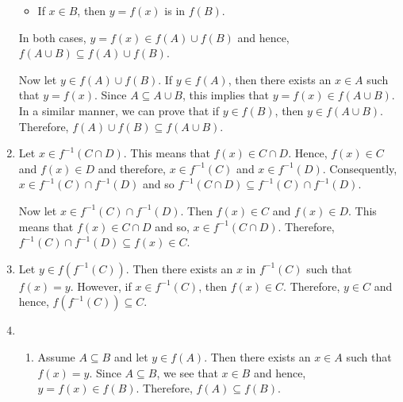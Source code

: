 \begin{enumerate}
\begin{itemize}
\item If $x \in B$, then $y = f \left( x \right)$ is in $f \left( B \right)$.
\end{itemize}
In both cases, $y = f \left( x \right) \in f \left( A \right) \cup f \left( B \right)$ and hence, 
$f \left( A \cup B \right) \subseteq f \left( A \right) \cup f \left( B \right)$.

Now let $y \in f \left( A \right) \cup f \left( B \right)$.  If $y \in f \left( A \right)$, then there exists an $x \in A$ such that $y = f \left( x \right)$.  Since $A \subseteq A \cup B$, this implies that $y = f \left( x \right) \in f \left( A \cup B \right)$.  In a similar manner, we can prove that if $y \in f \left( B \right)$, then $y \in f \left( A \cup B \right)$.  Therefore, 
$f \left( A \right) \cup f \left( B \right) \subseteq f \left( A \cup B \right)$.

\item Let $x \in f^{-1} \left( C \cap D \right)$.  This means that 
$f \left( x \right) \in C \cap D$.  Hence, $f \left( x \right) \in C$ and 
$f \left( x \right) \in D$ and therefore, $x \in f^{-1} \left( C \right)$ and 
$x \in f^{-1} \left( D \right)$.  Consequently, $x \in f^{-1} \left( C \right) \cap f^{-1} \left( D \right)$ and so 
$f^{-1} \left( C \cap D \right) \subseteq f^{-1} \left( C \right) \cap f^{-1} \left( D \right)$.

Now let $x \in f^{-1} \left( C \right) \cap f^{-1} \left( D \right)$.  Then 
$f \left( x \right) \in C$ and $f \left( x \right) \in D$.  This means that 
$f \left( x \right) \in C \cap D$ and so, $x \in f^{-1} \left( C \cap D \right)$.  Therefore, \linebreak
$f^{-1} \left( C \right) \cap f^{-1} \left( D \right) \subseteq f \left( x \right) \in C$.

\item Let $y \in f \left( f^{-1} \left( C \right) \right)$.  Then there exists an $x$ in 
$f^{-1} \left( C \right)$ such that \linebreak
$f \left( x \right) = y$. However, if  $x \in f^{-1} \left( C \right)$, then 
$f \left( x \right) \in C$.  Therefore, $y \in C$ and hence, 
$f \left( f^{-1} \left( C \right) \right) \subseteq C$.

\item \begin{enumerate}
\item  Assume $A \subseteq B$ and let $y \in f \left( A \right)$.  Then there exists an 
$x \in A$ such that $f \left( x \right) = y$.  Since $A \subseteq B$, we see that $x \in B$ and hence, $y = f \left( x \right) \in f \left( B \right)$.  Therefore, 
$f \left( A \right) \subseteq f \left( B \right)$.


\end{enumerate}
\end{enumerate}
